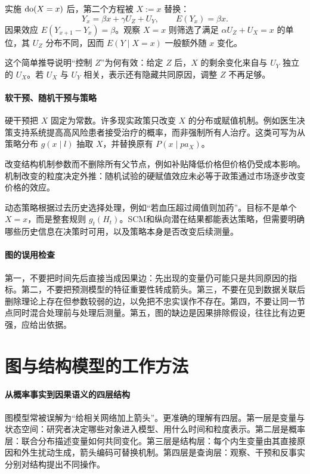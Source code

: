 实施 $\operatorname{do}(X=x)$ 后，第二个方程被 $X:=x$ 替换：
\[
Y_x=\beta x+\gamma U_Z+U_Y,
\qquad E(Y_x)=\beta x.
\]
因果效应 $E(Y_{x+1}-Y_x)=\beta$。观察 $X=x$ 则筛选了满足 $\alpha U_Z+U_X=x$ 的单位，其 $U_Z$ 分布不同，因而 $E(Y\mid X=x)$ 一般额外随 $x$ 变化。

这个简单推导说明“控制 $Z$”为何有效：给定 $Z$ 后，$X$ 的剩余变化来自与 $U_Y$ 独立的 $U_X$。若 $U_X$ 与 $U_Y$ 相关，表示还有隐藏共同原因，调整 $Z$ 不再足够。

\paragraph{软干预、随机干预与策略}

硬干预把 $X$ 固定为常数。许多现实政策只改变 $X$ 的分布或赋值机制。例如医生决策支持系统提高高风险患者接受治疗的概率，而非强制所有人治疗。这类可写为从策略分布 $g(x\mid l)$ 抽取 $X$，并替换原有 $P(x\mid pa_X)$。

改变结构机制参数而不删除所有父节点，例如补贴降低价格但价格仍受成本影响。机制改变的粒度决定外推：随机试验的硬赋值效应未必等于政策通过市场逐步改变价格的效应。

动态策略根据过去历史选择处理，例如“若血压超过阈值则加药”。目标不是单个 $X=x$，而是整套规则 $g_t(H_t)$。SCM和纵向潜在结果都能表达策略，但需要明确哪些历史信息在决策时可用，以及策略本身是否改变后续测量。

\paragraph{图的误用检查}

第一，不要把时间先后直接当成因果边：先出现的变量仍可能只是共同原因的指标。第二，不要把预测模型的特征重要性转成箭头。第三，不要在见到数据关联后删除理论上存在但参数较弱的边，以免把不忠实误作不存在。第四，不要让同一节点同时混合处理前与处理后测量。第五，图的缺边是因果排除假设，往往比有边更强，应给出依据。

\section{图与结构模型的工作方法}

\paragraph{从概率事实到因果语义的四层结构}

图模型常被误解为“给相关网络加上箭头”。更准确的理解有四层。第一层是变量与状态空间：研究者决定哪些对象进入模型、用什么时间和粒度表示。第二层是概率层：联合分布描述变量如何共同变化。第三层是结构层：每个内生变量由其直接原因和外生扰动生成，箭头编码可替换机制。第四层是查询层：观察、干预和反事实分别对结构提出不同操作。

